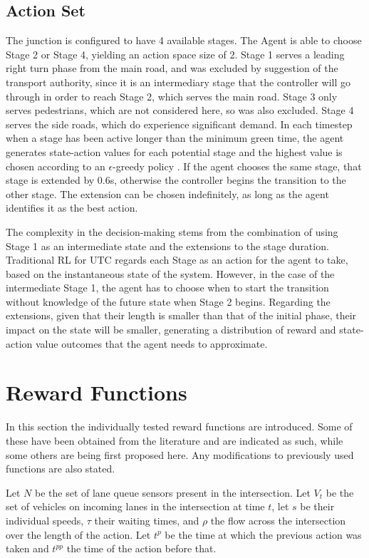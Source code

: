 \documentclass{article}
\begin{document}
\subsection{Action Set}
The junction is configured to have 4 available stages. The Agent is able to choose Stage 2 or Stage 4, yielding an action space size of 2.
Stage 1 serves a leading right turn phase from the main road, and was excluded by suggestion of the transport authority, since it is an intermediary stage that the controller will go through in order to reach Stage 2, which serves the main road.
Stage 3 only serves pedestrians, which are not considered here, so was also excluded.
Stage 4 serves the side roads, which do experience significant demand.
In each timestep when a stage has been active longer than the minimum green time, the agent generates state-action values for each potential stage and the highest value is chosen according to an $\epsilon$-greedy policy \cite{suttonbarto}. If the agent chooses the same stage, that stage is extended by 0.6s, otherwise the controller begins the transition to the other stage.
The extension can be chosen indefinitely, as long as the agent identifies it as the best action.

The complexity in the decision-making stems from the combination of using Stage 1 as an intermediate state and the extensions to the stage duration.
Traditional RL for UTC regards each Stage as an action for the agent to take, based on the instantaneous state of the system.
However, in the case of the intermediate Stage 1, the agent has to choose when to start the transition without knowledge of the future state when Stage 2 begins.
Regarding the extensions, given that their length is smaller than that of the initial phase, their impact on the state will be smaller, generating a distribution of reward and state-action value outcomes that the agent needs to approximate.

\section{Reward Functions} \label{rewards}
In this section the individually tested reward functions are introduced.
Some of these have been obtained from the literature and are indicated as such, while some others are being first proposed here.
Any modifications to previously used functions are also stated.

Let $N$ be the set of lane queue sensors present in the intersection.
Let $V_t$ be the set of vehicles on incoming lanes in the intersection at time $t$, let $s$ be their individual speeds, $\tau$ their waiting times, and $\rho$ the flow across the intersection over the length of the action.
Let $t^p$ be the time at which the previous action was taken and $t^{pp}$ the time of the action before that.
\end{document}
